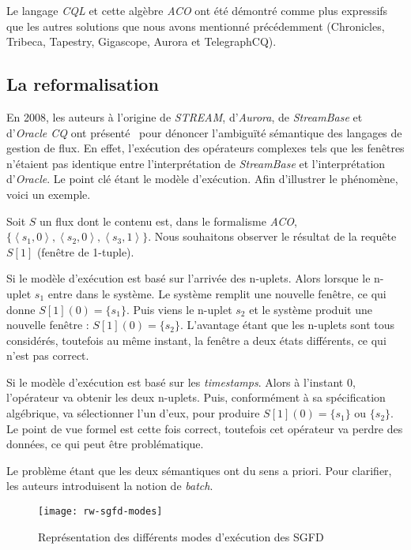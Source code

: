 Le langage \textit{CQL} et cette algèbre \textit{ACO} ont été démontré comme plus expressifs~\cite{Arasu:cql} que les autres solutions que nous avons mentionné précédemment (Chronicles, Tribeca, Tapestry, Gigascope, Aurora et TelegraphCQ).

\subsection{La reformalisation}
En 2008, les auteurs à l'origine de \textit{STREAM}, d'\textit{Aurora}, de \textit{StreamBase} et d'\textit{Oracle CQ} ont présenté~\cite{Jain:spread} pour dénoncer l'ambiguïté sémantique des langages de gestion de flux. En effet, l'exécution des opérateurs complexes tels que les fenêtres n'étaient pas identique entre l'interprétation de \textit{StreamBase} et l'interprétation d'\textit{Oracle}. Le point clé étant le modèle d'exécution. Afin d'illustrer le phénomène, voici un exemple.

\begin{example}
 Soit $S$ un flux dont le contenu est, dans le formalisme \textit{ACO}, $\{\left<s_1,0\right>, \left<s_2,0\right>, \left<s_3,1\right>\}$. Nous souhaitons observer le résultat de la requête $S[1]$ (fenêtre de 1-tuple).

Si le modèle d'exécution est basé sur l'arrivée des n-uplets. Alors lorsque le n-uplet $s_1$ entre dans le système. Le système remplit une nouvelle fenêtre, ce qui donne $S[1](0)=\{s_1\}$. Puis viens le n-uplet $s_2$ et le système produit une nouvelle fenêtre : $S[1](0)=\{s_2\}$. L'avantage étant que les n-uplets sont tous considérés, toutefois au même instant, la fenêtre a deux états différents, ce qui n'est pas correct.

Si le modèle d'exécution est basé sur les \textit{timestamps}. Alors à l'instant 0, l'opérateur va obtenir les deux n-uplets. Puis, conformément à sa spécification algébrique, va sélectionner l'un d'eux, pour produire $S[1](0) = \{s_1\}$ ou $\{s_2\}$. Le point de vue formel est cette fois correct, toutefois cet opérateur va perdre des données, ce qui peut être problématique.
\end{example}

Le problème étant que les deux sémantiques ont du sens a priori. Pour clarifier, les auteurs introduisent la notion de \textit{batch}. 
\begin{figure}[ht]
    \centering
    \texttt{[image: rw-sgfd-modes]}
    \caption{Représentation des différents modes d'exécution des SGFD}
\end{figure}


